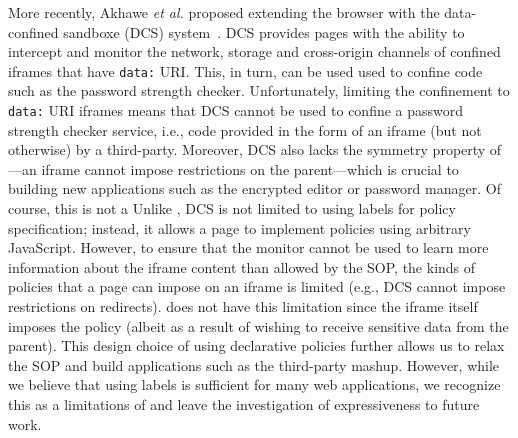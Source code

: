 More recently, Akhawe \emph{et al.} proposed extending the browser
with the data-confined sandboxe (DCS) system~\cite{Akhawe2013}.
%
DCS provides pages with the ability to intercept and monitor the
network, storage and cross-origin channels of confined iframes that
have \verb|data:| URI.
%
This, in turn, can be used used to confine code such as the password
strength checker.
%
Unfortunately, limiting the confinement to \verb|data:| URI iframes
means that DCS cannot be used to confine a password strength checker
service, i.e., code provided in the form of an iframe (but not
otherwise) by a third-party.
%
Moreover, DCS also lacks the symmetry property of \sys{}---an iframe
cannot impose restrictions on the parent---which is crucial to
building new applications such as the encrypted editor or password
manager.
%
Of course, this is not a 
%
Unlike \sys{}, DCS is not limited to using labels for policy
specification; instead, it allows a page to implement policies using
arbitrary JavaScript.
%
However, to ensure that the monitor cannot be used to learn more
information about the iframe content than allowed by the SOP, the
kinds of policies that a page can impose on an iframe is limited
(e.g., DCS cannot impose restrictions on redirects).
%
\sys{} does not have this limitation since the iframe itself imposes
the policy (albeit as a result of wishing to receive sensitive data
from the parent).
%
This design choice of using declarative policies further allows us to
relax the SOP and build applications such as the third-party mashup.
%
However, while we believe that using labels is sufficient for many
web applications, we recognize this as a limitations of \sys{} and
leave the investigation of expressiveness to future work.




